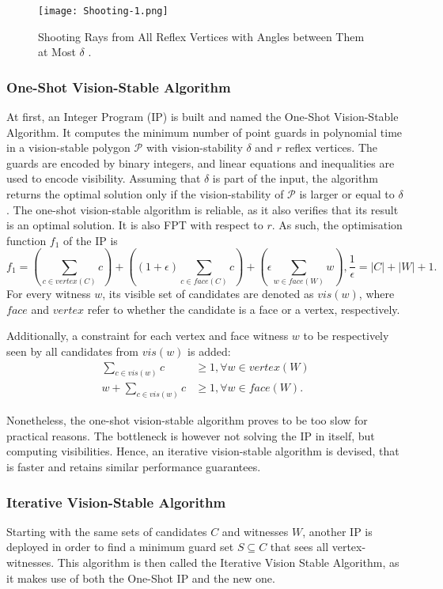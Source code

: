 \begin{figure}[h!]
    \centering
    \texttt{[image: Shooting-1.png]}
    \caption{Shooting Rays from All Reflex Vertices with Angles between Them at Most $\delta$ \cite{DBLP:journals/corr/abs-2007-06920}.}
    \label{fig:rays}
\end{figure}


\subsubsection{One-Shot Vision-Stable Algorithm}
At first, an Integer Program (IP) is built and named the One-Shot Vision-Stable Algorithm. It computes the minimum number of point guards in polynomial time in a vision-stable polygon $\mathcal P$ with  vision-stability $\delta$ and $r$ reflex vertices. The guards are encoded by binary integers, and linear equations and inequalities are used to encode visibility. Assuming that $\delta$ is part of the input, the algorithm returns the optimal solution only if the vision-stability of $\mathcal P$ is larger or equal to $\delta$. The one-shot vision-stable algorithm is reliable, as it also verifies that its result is an optimal solution. It is also FPT with respect to $r$. As such, the optimisation function $f_1$ of the IP is $$f_1 = (\sum_{c \in vertex(C)} c) + ((1 + \epsilon)\sum_{c \in face(C)} c) + (\epsilon \sum_{w \in face(W)} w), \frac 1 \epsilon = |C| + |W| + 1.$$ For every witness $w$, its visible set of candidates are denoted as $vis(w)$, where $face$ and $vertex$ refer to whether the candidate is a face or a vertex, respectively.

Additionally, a constraint for each vertex and face witness $w$ to be respectively seen by all candidates from $vis(w)$ is added:
	\begin{align*}
		\sum_{c \in vis(w)} c &\geq 1, \forall w \in vertex(W) \\
		w + \sum_{c \in vis(w)} c &\geq 1, \forall w \in face(W).
	\end{align*}

Nonetheless, the one-shot vision-stable algorithm proves to be too slow for practical reasons. The bottleneck is however not solving the IP in itself, but computing visibilities. Hence, an iterative vision-stable algorithm is devised, that is faster and retains similar performance guarantees. 

\subsubsection{Iterative Vision-Stable Algorithm}
Starting with the same sets of candidates $C$ and witnesses $W$, another IP is deployed in order to find a minimum guard set $S \subseteq C$ that sees all vertex-witnesses. This algorithm is then called the Iterative Vision Stable Algorithm, as it makes use of both the One-Shot IP and the new one. 

